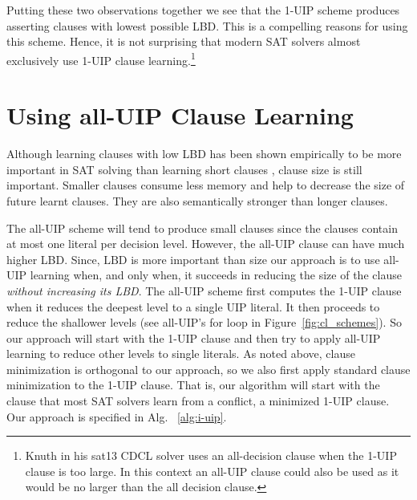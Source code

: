 \documentclass[runningheads]{llncs}
\newcommand{\sat}{SAT\xspace}
\newcommand{\LBD}{\text{LBD}\xspace}
\begin{document}
Putting these two observations together we see that the 1-UIP scheme
produces asserting clauses with lowest possible LBD. This is a
compelling reasons for using this scheme. Hence, it is not surprising
that modern \sat solvers almost exclusively use 1-UIP clause
learning.\footnote{Knuth in his sat13 CDCL solver \cite{Knuth:Sat13}
  uses an all-decision clause when the 1-UIP clause is too large. In
  this context an all-UIP clause could also be used as it would be no
  larger than the all decision clause.}

\section{Using all-UIP Clause Learning}
\label{sec:i-uip}
Although learning clauses with low LBD has been shown empirically to
be more important in \sat solving than learning short clauses
\cite{DBLP:conf/ijcai/AudemardS09}, clause size is still
important. Smaller clauses consume less memory and help to decrease
the size of future learnt clauses. They are also semantically stronger
than longer clauses.

The all-UIP scheme will tend to produce small clauses since the
clauses contain at most one literal per decision level. However, the
all-UIP clause can have much higher LBD. Since, $\LBD$ is more important
than size our approach is to use all-UIP learning when, and only when,
it succeeds in reducing the size of the clause \emph{without
  increasing its LBD}. The all-UIP scheme first computes the 1-UIP
clause when it reduces the deepest level to a single UIP literal. It
then proceeds to reduce the shallower levels (see all-UIP's for loop
in Figure~\ref{fig:cl_schemes}). So our approach will start with the
1-UIP clause and then try to apply all-UIP learning to reduce other
levels to single literals. As noted above, clause minimization is
orthogonal to our approach, so we also first apply standard clause
minimization \cite{DBLP:conf/sat/SorenssonB09} to the 1-UIP
clause. That is, our algorithm will start with the clause that most
\sat solvers learn from a conflict, a minimized 1-UIP clause. Our
approach is specified in Alg. ~\ref{alg:i-uip}.
\end{document}

